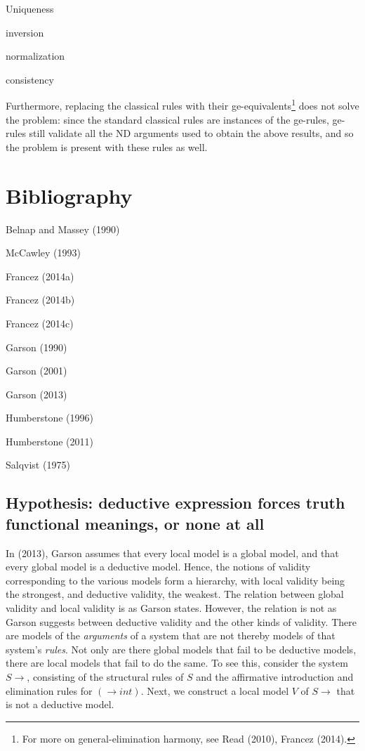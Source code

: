 \documentclass[]{article}
\begin{document}
Uniqueness

inversion

normalization

consistency

Furthermore, replacing the classical rules with their ge-equivalents\footnote{For more on general-elimination harmony, see Read (2010), Francez (2014).} does not solve the problem: since the standard classical rules are instances of the ge-rules, ge-rules still validate all the ND arguments used to obtain the above results, and so the problem is present with these rules as well.
\section{Bibliography}
Belnap and Massey (1990)

McCawley (1993)

Francez (2014a)

Francez (2014b)

Francez (2014c)

Garson (1990)

Garson (2001)

Garson (2013)

Humberstone (1996)

Humberstone (2011)

Salqvist (1975)
\subsection{Hypothesis: deductive expression forces truth functional meanings, or none at all}
In (2013), Garson assumes that every local model is a global model, and that every global model is a deductive model. Hence, the notions of validity corresponding to the various models form a hierarchy, with local validity being the strongest, and deductive validity, the weakest. The relation between global validity and local validity is as Garson states. However, the relation is not as Garson suggests between deductive validity and the other kinds of validity. There are models of the \textit{arguments} of a system that are not thereby models of that system's \textit{rules}. Not only are there global models that fail to be deductive models, there are local models that fail to do the same. To see this, consider the system $S\rightarrow$,  consisting of the structural rules of $S$ and the affirmative introduction and elimination rules for $(\rightarrow int)$. Next, we construct a local model $V$ of $S\rightarrow$ that is not a deductive model.
\end{document}
